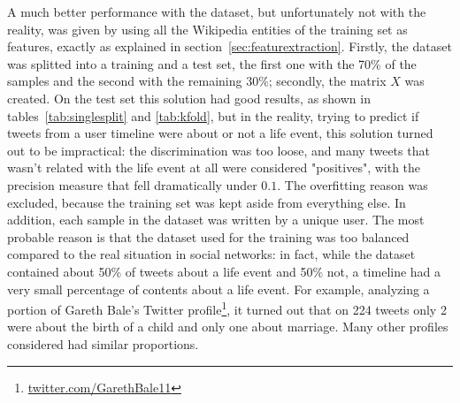 \begin{table}[htbp]
\centering
{}\qquad\qquad
{}
\caption{The performance of the naive bayes were satisfactory on a very balanced dataset. Unfortunatly, users' timelines are very unbalanced, and this classifier turned out to be inappropriate.}
\end{table}

A much better performance with the dataset, but unfortunately not with the reality, was given by using all the Wikipedia entities of the training set as features, exactly as explained in section~\ref{sec:featurextraction}. Firstly, the dataset was splitted into a training and a test set, the first one with the 70\% of the samples and the second with the remaining 30\%; secondly, the matrix $X$ was created. On the test set this solution had good results, as shown in tables~\ref{tab:singlesplit} and \ref{tab:kfold}, but in the reality, trying to predict if tweets from a user timeline were about or not a life event, this solution turned out to be impractical: the discrimination was too loose, and many tweets that wasn't related with the life event at all were considered "positives", with the precision measure that fell dramatically under $0.1$. The overfitting reason was excluded, because the training set was kept aside from everything else. In addition, each sample in the dataset was written by a unique user. The most probable reason is that the dataset used for the training was too balanced compared to the real situation in social networks: in fact, while the dataset contained about 50\% of tweets about a life event and 50\% not, a timeline had a very small percentage of contents about a life event. For example, analyzing a portion of Gareth Bale's Twitter profile\footnote{\url{twitter.com/GarethBale11}}, it turned out that on 224 tweets only 2 were about the birth of a child and only one about marriage. Many other profiles considered had similar proportions.

